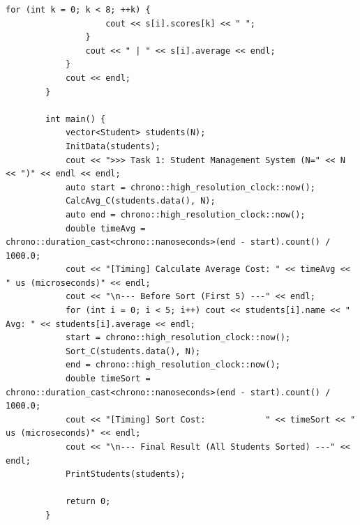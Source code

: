 \documentclass[supercite]{Experimental_Report}
\theoremstyle{definition}
\begin{document}
\begin{lstlisting}[style=commonCodeStyle, caption={task1.cpp}, label={lst:7-3}]
				for (int k = 0; k < 8; ++k) {
					cout << s[i].scores[k] << " ";
				}
				cout << " | " << s[i].average << endl;
			}
			cout << endl;
		}
		
		int main() {
			vector<Student> students(N);
			InitData(students);
			cout << ">>> Task 1: Student Management System (N=" << N << ")" << endl << endl;
			auto start = chrono::high_resolution_clock::now();
			CalcAvg_C(students.data(), N);
			auto end = chrono::high_resolution_clock::now();
			double timeAvg = chrono::duration_cast<chrono::nanoseconds>(end - start).count() / 1000.0;
			cout << "[Timing] Calculate Average Cost: " << timeAvg << " us (microseconds)" << endl;
			cout << "\n--- Before Sort (First 5) ---" << endl;
			for (int i = 0; i < 5; i++) cout << students[i].name << " Avg: " << students[i].average << endl;
			start = chrono::high_resolution_clock::now();
			Sort_C(students.data(), N);
			end = chrono::high_resolution_clock::now();
			double timeSort = chrono::duration_cast<chrono::nanoseconds>(end - start).count() / 1000.0;
			cout << "[Timing] Sort Cost:            " << timeSort << " us (microseconds)" << endl;
			cout << "\n--- Final Result (All Students Sorted) ---" << endl;
			PrintStudents(students);
			
			return 0;
		}
		
	\end{lstlisting}
	
\end{document}
